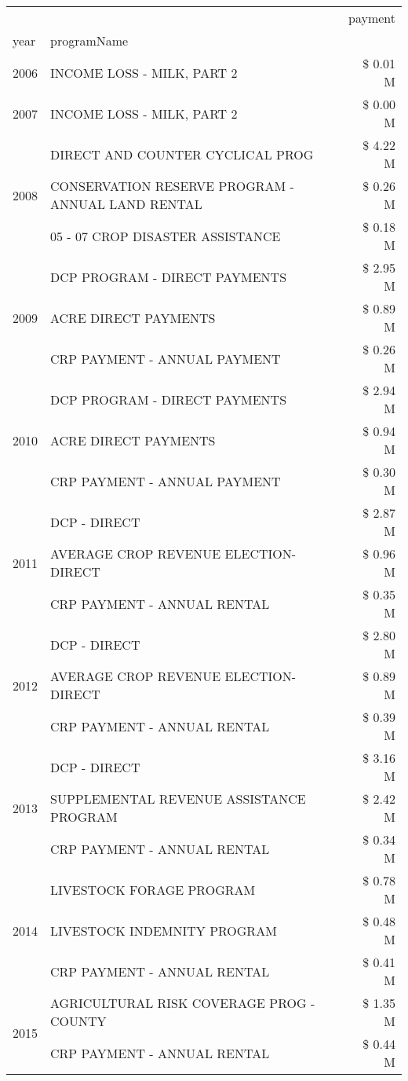 \begin{tabular}{llr}
\toprule
 &  & payment \\
year & programName &  \\
\midrule
2006 & INCOME LOSS - MILK, PART 2 & \$ 0.01 M \\
\cline{1-3}
2007 & INCOME LOSS - MILK, PART 2 & \$ 0.00 M \\
\cline{1-3}
\multirow[t]{3}{*}{2008} & DIRECT AND COUNTER CYCLICAL PROG & \$ 4.22 M \\
 & CONSERVATION RESERVE PROGRAM - ANNUAL LAND RENTAL & \$ 0.26 M \\
 & 05 - 07 CROP DISASTER ASSISTANCE & \$ 0.18 M \\
\cline{1-3}
\multirow[t]{3}{*}{2009} & DCP PROGRAM - DIRECT PAYMENTS & \$ 2.95 M \\
 & ACRE DIRECT PAYMENTS & \$ 0.89 M \\
 & CRP PAYMENT - ANNUAL PAYMENT & \$ 0.26 M \\
\cline{1-3}
\multirow[t]{3}{*}{2010} & DCP PROGRAM - DIRECT PAYMENTS & \$ 2.94 M \\
 & ACRE DIRECT PAYMENTS & \$ 0.94 M \\
 & CRP PAYMENT - ANNUAL PAYMENT & \$ 0.30 M \\
\cline{1-3}
\multirow[t]{3}{*}{2011} & DCP - DIRECT & \$ 2.87 M \\
 & AVERAGE CROP REVENUE ELECTION-DIRECT & \$ 0.96 M \\
 & CRP PAYMENT - ANNUAL RENTAL & \$ 0.35 M \\
\cline{1-3}
\multirow[t]{3}{*}{2012} & DCP - DIRECT & \$ 2.80 M \\
 & AVERAGE CROP REVENUE ELECTION-DIRECT & \$ 0.89 M \\
 & CRP PAYMENT - ANNUAL RENTAL & \$ 0.39 M \\
\cline{1-3}
\multirow[t]{3}{*}{2013} & DCP - DIRECT & \$ 3.16 M \\
 & SUPPLEMENTAL REVENUE ASSISTANCE PROGRAM & \$ 2.42 M \\
 & CRP PAYMENT - ANNUAL RENTAL & \$ 0.34 M \\
\cline{1-3}
\multirow[t]{3}{*}{2014} & LIVESTOCK FORAGE PROGRAM & \$ 0.78 M \\
 & LIVESTOCK INDEMNITY PROGRAM & \$ 0.48 M \\
 & CRP PAYMENT - ANNUAL RENTAL & \$ 0.41 M \\
\cline{1-3}
\multirow[t]{3}{*}{2015} & AGRICULTURAL RISK COVERAGE PROG - COUNTY & \$ 1.35 M \\
 & CRP PAYMENT - ANNUAL RENTAL & \$ 0.44 M \\

\end{tabular}
